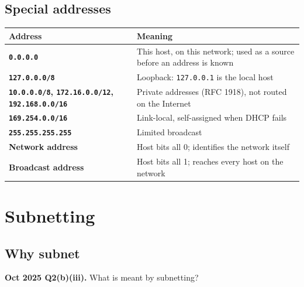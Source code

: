 \documentclass[11pt,a4paper]{article}
\begin{document}
\subsection{Special addresses}

\begin{center}\small
\begin{tabularx}{\textwidth}{>{\bfseries}p{} X}
\toprule Address & Meaning\\
\midrule
\texttt{0.0.0.0} & This host, on this network; used as a source before an address is known\\
\texttt{127.0.0.0/8} & Loopback: \texttt{127.0.0.1} is the local host\\
\texttt{10.0.0.0/8}, \texttt{172.16.0.0/12}, \texttt{192.168.0.0/16} & Private addresses (RFC 1918), not routed on the Internet\\
\texttt{169.254.0.0/16} & Link-local, self-assigned when DHCP fails\\
\texttt{255.255.255.255} & Limited broadcast\\
Network address & Host bits all 0; identifies the network itself\\
Broadcast address & Host bits all 1; reaches every host on the network\\
\bottomrule
\end{tabularx}
\end{center}

\section{Subnetting}

\subsection{Why subnet}

\begin{pyqbox}
\textbf{Oct 2025 Q2(b)(iii).} What is meant by subnetting?
\end{pyqbox}
\end{document}
